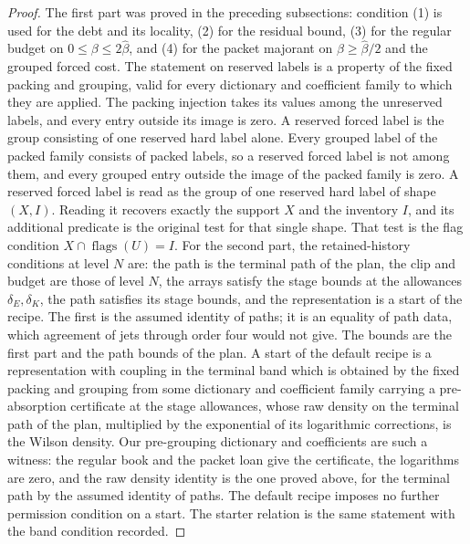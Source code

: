 \begin{proof}
The first part was proved in the preceding subsections: condition (1)
is used for the debt and its locality, (2) for the residual bound,
(3) for the regular budget on $0\le\beta\le2\widehat\beta$, and (4)
for the packet majorant on $\beta\ge\widehat\beta/2$ and the grouped
forced cost. The statement on reserved labels is a property of the
fixed packing and grouping, valid for every dictionary and
coefficient family to which they are applied. The packing injection
takes its values among the unreserved labels, and every entry outside
its image is zero. A reserved forced label is the group consisting of
one reserved hard label alone. Every grouped label of the packed
family consists of packed labels, so a reserved forced label is not
among them, and every grouped entry outside the image of the packed
family is zero. A reserved forced label is read as the group of one
reserved hard label of shape $(X,I)$. Reading it recovers exactly the
support $X$ and the inventory $I$, and its additional predicate is the
original test for that single shape. That test is the flag condition
$X\cap\operatorname{flags}(U)=I$. For the second part, the retained-history conditions at
level $N$ are: the path is the terminal path of the plan, the clip
and budget are those of level $N$, the arrays satisfy the stage
bounds at the allowances $\delta_E,\delta_K$, the path satisfies its
stage bounds, and the representation is a start of the recipe. The
first is the assumed identity of paths; it is an equality of path
data, which agreement of jets through order four would not give. The
bounds are the first part and the path bounds of the plan. A start of
the default recipe is a representation with coupling in the terminal
band which is obtained by the fixed packing and grouping from some
dictionary and coefficient family carrying a pre-absorption
certificate at the stage allowances, whose raw density on the
terminal path of the plan, multiplied by the exponential of its
logarithmic corrections, is the Wilson density. Our pre-grouping
dictionary and coefficients are such a witness: the regular book and
the packet loan give the certificate, the logarithms are zero, and
the raw density identity is the one proved above, for the terminal
path by the assumed identity of paths. The default recipe imposes no
further permission condition on a start. The starter relation is the
same statement with the band condition recorded.
\end{proof}

